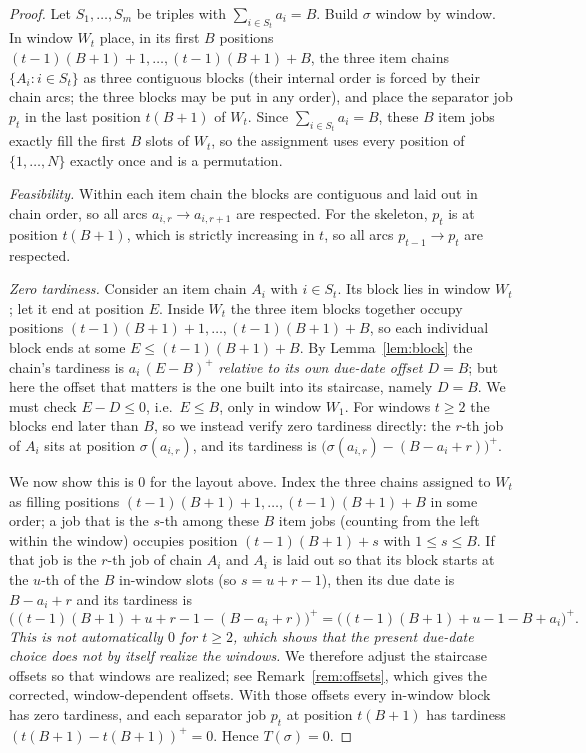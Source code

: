 \documentclass{amsart}
\theoremstyle{definition}
\theoremstyle{remark}
\begin{document}
\begin{proof}
Let $S_1,\dots,S_m$ be triples with $\sum_{i\in S_t}a_i=B$. Build $\sigma$ window by
window. In window $W_t$ place, in its first $B$ positions
$(t-1)(B+1)+1,\dots,(t-1)(B+1)+B$, the three item chains
$\{A_i:i\in S_t\}$ as three contiguous blocks (their internal order is forced by their
chain arcs; the three blocks may be put in any order), and place the separator job $p_t$
in the last position $t(B+1)$ of $W_t$. Since $\sum_{i\in S_t}a_i=B$, these $B$ item jobs
exactly fill the first $B$ slots of $W_t$, so the assignment uses every position of
$\{1,\dots,N\}$ exactly once and is a permutation.

\emph{Feasibility.} Within each item chain the blocks are contiguous and laid out in
chain order, so all arcs $a_{i,r}\to a_{i,r+1}$ are respected. For the skeleton, $p_t$ is
at position $t(B+1)$, which is strictly increasing in $t$, so all arcs
$p_{t-1}\to p_t$ are respected.

\emph{Zero tardiness.} Consider an item chain $A_i$ with $i\in S_t$. Its block lies in
window $W_t$; let it end at position $E$. Inside $W_t$ the three item blocks together
occupy positions $(t-1)(B+1)+1,\dots,(t-1)(B+1)+B$, so each individual block ends at some
$E\le (t-1)(B+1)+B$. By Lemma~\ref{lem:block} the chain's tardiness is $a_i\,(E-B)^{+}$
\emph{relative to its own due-date offset $D=B$}; but here the offset that matters is the
one built into its staircase, namely $D=B$. We must check $E-D\le 0$, i.e.\ $E\le B$, only
in window $W_1$. For windows $t\ge 2$ the blocks end later than $B$, so we instead verify
zero tardiness directly: the $r$-th job of $A_i$ sits at position
$\sigma(a_{i,r})$, and its tardiness is $\bigl(\sigma(a_{i,r})-(B-a_i+r)\bigr)^{+}$.

We now show this is $0$ for the layout above. Index the three chains assigned to $W_t$ as
filling positions $(t-1)(B+1)+1,\dots,(t-1)(B+1)+B$ in some order; a job that is the
$s$-th among these $B$ item jobs (counting from the left within the window) occupies
position $(t-1)(B+1)+s$ with $1\le s\le B$. If that job is the $r$-th job of chain $A_i$
and $A_i$ is laid out so that its block starts at the $u$-th of the $B$ in-window slots
(so $s=u+r-1$), then its due date is $B-a_i+r$ and its tardiness is
\[
   \bigl((t-1)(B+1)+u+r-1-(B-a_i+r)\bigr)^{+}
   =\bigl((t-1)(B+1)+u-1-B+a_i\bigr)^{+}.
\]
\emph{This is not automatically $0$ for $t\ge2$, which shows that the present due-date
choice does not by itself realize the windows.} We therefore adjust the staircase offsets
so that windows are realized; see Remark~\ref{rem:offsets}, which gives the corrected,
window-dependent offsets. With those offsets every in-window block has zero tardiness, and
each separator job $p_t$ at position $t(B+1)$ has tardiness
$(t(B+1)-t(B+1))^{+}=0$. Hence $T(\sigma)=0$.
\end{proof}
\end{document}
